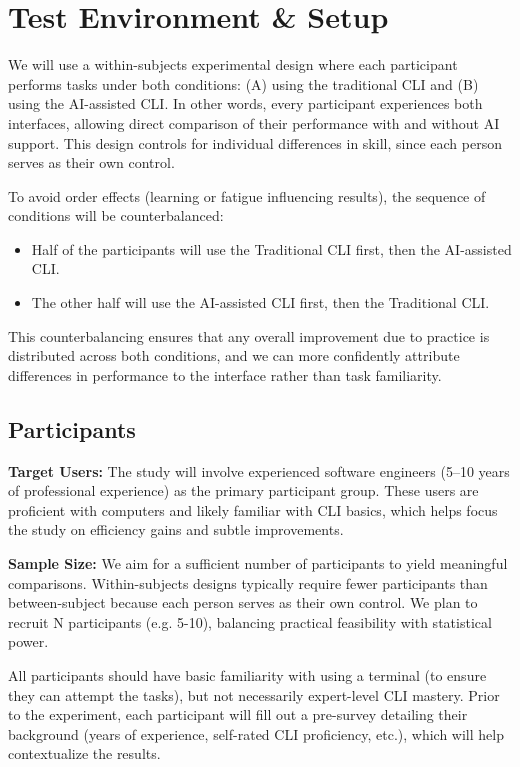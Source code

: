 \section{Test Environment \& Setup}

We will use a within-subjects experimental design where each participant performs tasks under both conditions: (A) using the traditional CLI and (B) using the AI-assisted CLI. In other words, every participant experiences both interfaces, allowing direct comparison of their performance with and without AI support. This design controls for individual differences in skill, since each person serves as their own control.

To avoid order effects (learning or fatigue influencing results), the sequence of conditions will be counterbalanced:
\begin{itemize}
	\item Half of the participants will use the Traditional CLI first, then the AI-assisted CLI.
	\item The other half will use the AI-assisted CLI first, then the Traditional CLI.
\end{itemize}

This counterbalancing ensures that any overall improvement due to practice is distributed across both conditions, and we can more confidently attribute differences in performance to the interface rather than task familiarity.

\subsection{Participants}

\textbf{Target Users:} The study will involve experienced software engineers (5–10 years of professional experience) as the primary participant group. These users are proficient with computers and likely familiar with CLI basics, which helps focus the study on efficiency gains and subtle improvements.

\textbf{Sample Size:} We aim for a sufficient number of participants to yield meaningful comparisons. Within-subjects designs typically require fewer participants than between-subject because each person serves as their own control. We plan to recruit N participants (e.g. 5-10), balancing practical feasibility with statistical power.

All participants should have basic familiarity with using a terminal (to ensure they can attempt the tasks), but not necessarily expert-level CLI mastery. Prior to the experiment, each participant will fill out a pre-survey detailing their background (years of experience, self-rated CLI proficiency, etc.), which will help contextualize the results.

